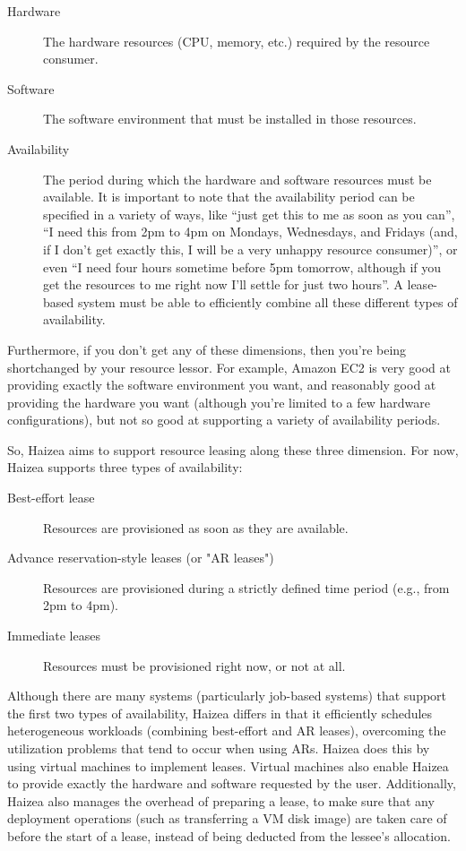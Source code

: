 \begin{description}
 \item[Hardware] The hardware resources (CPU, memory, etc.) required by the resource consumer.
 \item[Software] The software environment that must be installed in those resources.
 \item[Availability] The period during which the hardware and software resources must be available. It is important to note that the availability period can be specified in a variety of ways, like ``just get this to me as soon as you can'', ``I need this from 2pm to 4pm on Mondays, Wednesdays, and Fridays (and, if I don't get exactly this, I will be a very unhappy resource consumer)'', or even ``I need four hours sometime before 5pm tomorrow, although if you get the resources to me right now I'll settle for just two hours''. A lease-based system must be able to efficiently combine all these different types of availability.
\end{description}

Furthermore, if you don't get any of these dimensions, then you're being shortchanged by your resource lessor. For example, Amazon EC2 is very good at providing exactly the software environment you want, and reasonably good at providing the hardware you want (although you're limited to a few hardware configurations), but not so good at supporting a variety of availability periods.

So, Haizea aims to support resource leasing along these three dimension. For now, Haizea supports three types of availability:

\begin{description}
\item[Best-effort lease] Resources are provisioned as soon as they are available.
\item[Advance reservation-style leases (or "AR leases")] Resources are provisioned during a strictly defined time period (e.g., from 2pm to 4pm).
\item[Immediate leases] Resources must be provisioned right now, or not at all.
\end{description}

Although there are many systems (particularly job-based systems) that support the first two types of availability, Haizea differs in that it efficiently schedules heterogeneous workloads (combining best-effort and AR leases), overcoming the utilization problems that tend to occur when using ARs. Haizea does this by using virtual machines to implement leases. Virtual machines also enable Haizea to provide exactly the hardware and software requested by the user. Additionally, Haizea also manages the overhead of preparing a lease, to make sure that any deployment operations (such as transferring a VM disk image) are taken care of before the start of a lease, instead of being deducted from the lessee's allocation.

